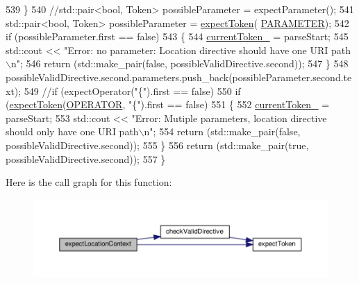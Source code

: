 \begin{DoxyCode}
539         \}
540         \textcolor{comment}{//std::pair<bool, Token> possibleParameter = expectParameter();}
541         std::pair<bool, Token> possibleParameter = \hyperlink{classft_1_1_parser_a1615a752d3642bb53598e2c8db810db0}{expectToken}(
      \hyperlink{namespaceft_aa520fbf142ba1e7e659590c07da31921a194cde856bd2d79eac8adb9741c55940}{PARAMETER});
542         \textcolor{keywordflow}{if} (possibleParameter.first == \textcolor{keyword}{false})
543         \{
544             \hyperlink{classft_1_1_parser_a942c5b794d108f144c5b5028aaa34cb6}{currentToken\_} = parseStart;
545             std::cout << \textcolor{stringliteral}{"Error: no parameter: Location directive should have one URI path\(\backslash\)n"};
546             \textcolor{keywordflow}{return} (std::make\_pair(\textcolor{keyword}{false}, possibleValidDirective.second));
547         \}
548         possibleValidDirective.second.parameters.push\_back(possibleParameter.second.text);
549         \textcolor{comment}{//if (expectOperator("\{").first == false)}
550         \textcolor{keywordflow}{if} (\hyperlink{classft_1_1_parser_a1615a752d3642bb53598e2c8db810db0}{expectToken}(\hyperlink{namespaceft_aa520fbf142ba1e7e659590c07da31921a6411d9d6073252e4d316493506bbb979}{OPERATOR}, \textcolor{stringliteral}{"\{"}).first == \textcolor{keyword}{false})
551         \{
552             \hyperlink{classft_1_1_parser_a942c5b794d108f144c5b5028aaa34cb6}{currentToken\_} = parseStart;
553             std::cout << \textcolor{stringliteral}{"Error: Mutiple parameters, location directive should only have one URI path\(\backslash\)n"};
554             \textcolor{keywordflow}{return} (std::make\_pair(\textcolor{keyword}{false}, possibleValidDirective.second));
555         \}
556         \textcolor{keywordflow}{return} (std::make\_pair(\textcolor{keyword}{true}, possibleValidDirective.second));
557     \}
\end{DoxyCode}
Here is the call graph for this function\+:
\nopagebreak
\begin{figure}[H]
\begin{center}
\leavevmode
\includegraphics[width=350pt]{classft_1_1_parser_a002b236022851df6ef2203aab9b24a73_cgraph}
\end{center}
\end{figure}
